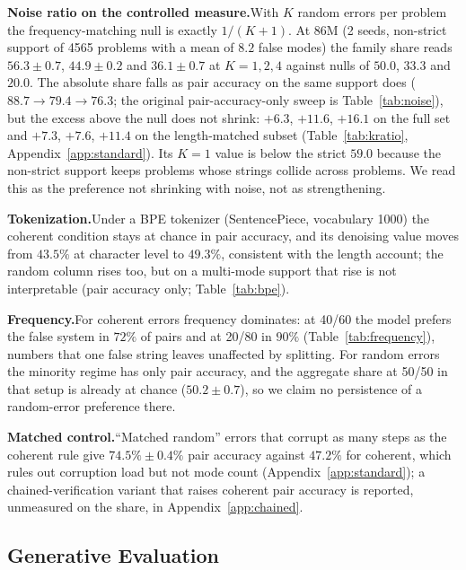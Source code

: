 \documentclass{article}
\begin{document}
\textbf{Noise ratio on the controlled measure.}\quad With $K$ random errors per problem the frequency-matching null is exactly $1/(K{+}1)$. At 86M (2 seeds, non-strict support of 4565 problems with a mean of $8.2$ false modes) the family share reads $56.3 \pm 0.7$, $44.9 \pm 0.2$ and $36.1 \pm 0.7$ at $K{=}1, 2, 4$ against nulls of $50.0$, $33.3$ and $20.0$. The absolute share falls as pair accuracy on the same support does ($88.7 \to 79.4 \to 76.3$; the original pair-accuracy-only sweep is Table~\ref{tab:noise}), but the excess above the null does not shrink: $+6.3$, $+11.6$, $+16.1$ on the full set and $+7.3$, $+7.6$, $+11.4$ on the length-matched subset (Table~\ref{tab:kratio}, Appendix~\ref{app:standard}). Its $K{=}1$ value is below the strict $59.0$ because the non-strict support keeps problems whose strings collide across problems. We read this as the preference not shrinking with noise, not as strengthening.

\textbf{Tokenization.}\quad Under a BPE tokenizer (SentencePiece, vocabulary 1000) the coherent condition stays at chance in pair accuracy, and its denoising value moves from $43.5\%$ at character level to $49.3\%$, consistent with the length account; the random column rises too, but on a multi-mode support that rise is not interpretable (pair accuracy only; Table~\ref{tab:bpe}).

\textbf{Frequency.}\quad For coherent errors frequency dominates: at 40/60 the model prefers the false system in $72\%$ of pairs and at 20/80 in $90\%$ (Table~\ref{tab:frequency}), numbers that one false string leaves unaffected by splitting. For random errors the minority regime has only pair accuracy, and the aggregate share at 50/50 in that setup is already at chance ($50.2 \pm 0.7$), so we claim no persistence of a random-error preference there.

\textbf{Matched control.}\quad ``Matched random'' errors that corrupt as many steps as the coherent rule give $74.5\% \pm 0.4\%$ pair accuracy against $47.2\%$ for coherent, which rules out corruption load but not mode count (Appendix~\ref{app:standard}); a chained-verification variant that raises coherent pair accuracy is reported, unmeasured on the share, in Appendix~\ref{app:chained}.

\subsection{Generative Evaluation}
\label{sec:generative}
\end{document}
